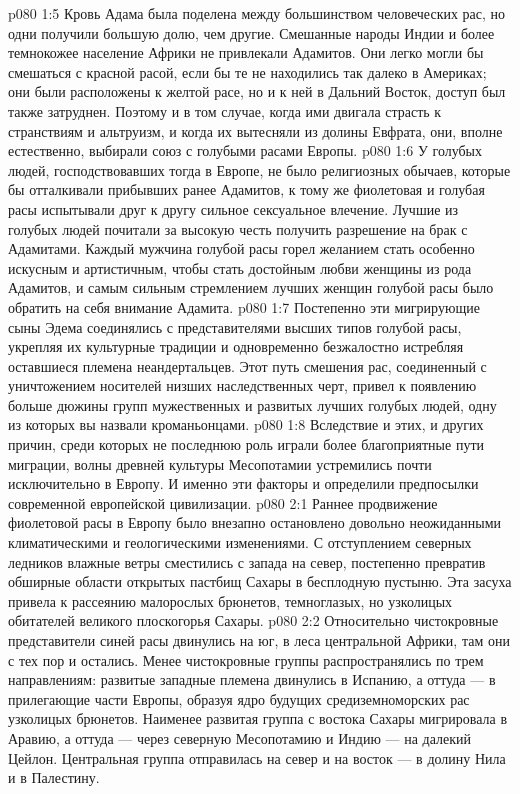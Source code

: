 \vs p080 1:5 Кровь Адама была поделена между большинством человеческих рас, но одни получили большую долю, чем другие. Смешанные народы Индии и более темнокожее население Африки не привлекали Адамитов. Они легко могли бы смешаться с красной расой, если бы те не находились так далеко в Америках; они были расположены к желтой расе, но и к ней в Дальний Восток, доступ был также затруднен. Поэтому и в том случае, когда ими двигала страсть к странствиям и альтруизм, и когда их вытесняли из долины Евфрата, они, вполне естественно, выбирали союз с голубыми расами Европы.
\vs p080 1:6 У голубых людей, господствовавших тогда в Европе, не было религиозных обычаев, которые бы отталкивали прибывших ранее Адамитов, к тому же фиолетовая и голубая расы испытывали друг к другу сильное сексуальное влечение. Лучшие из голубых людей почитали за высокую честь получить разрешение на брак с Адамитами. Каждый мужчина голубой расы горел желанием стать особенно искусным и артистичным, чтобы стать достойным любви женщины из рода Адамитов, и самым сильным стремлением лучших женщин голубой расы было обратить на себя внимание Адамита.
\vs p080 1:7 Постепенно эти мигрирующие сыны Эдема соединялись с представителями высших типов голубой расы, укрепляя их культурные традиции и одновременно безжалостно истребляя оставшиеся племена неандертальцев. Этот путь смешения рас, соединенный с уничтожением носителей низших наследственных черт, привел к появлению больше дюжины групп мужественных и развитых лучших голубых людей, одну из которых вы назвали кроманьонцами.
\vs p080 1:8 Вследствие и этих, и других причин, среди которых не последнюю роль играли более благоприятные пути миграции, волны древней культуры Месопотамии устремились почти исключительно в Европу. И именно эти факторы и определили предпосылки современной европейской цивилизации.
\vs p080 2:1 Раннее продвижение фиолетовой расы в Европу было внезапно остановлено довольно неожиданными климатическими и геологическими изменениями. С отступлением северных ледников влажные ветры сместились с запада на север, постепенно превратив обширные области открытых пастбищ Сахары в бесплодную пустыню. Эта засуха привела к рассеянию малорослых брюнетов, темноглазых, но узколицых обитателей великого плоскогорья Сахары.
\vs p080 2:2 Относительно чистокровные представители синей расы двинулись на юг, в леса центральной Африки, там они с тех пор и остались. Менее чистокровные группы распространялись по трем направлениям: развитые западные племена двинулись в Испанию, а оттуда --- в прилегающие части Европы, образуя ядро будущих средиземноморских рас узколицых брюнетов. Наименее развитая группа с востока Сахары мигрировала в Аравию, а оттуда --- через северную Месопотамию и Индию --- на далекий Цейлон. Центральная группа отправилась на север и на восток --- в долину Нила и в Палестину.
